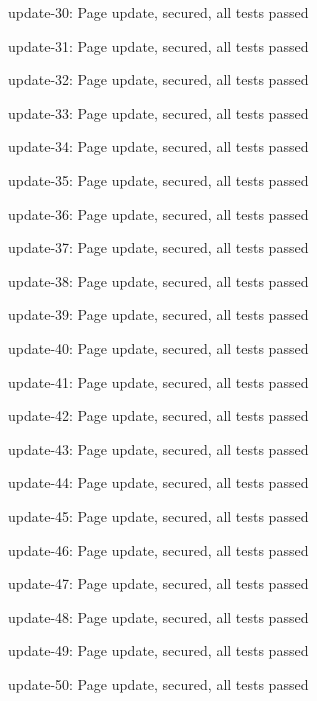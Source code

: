 update-30: Page update, secured, all tests passed

update-31: Page update, secured, all tests passed

update-32: Page update, secured, all tests passed

update-33: Page update, secured, all tests passed

update-34: Page update, secured, all tests passed

update-35: Page update, secured, all tests passed

update-36: Page update, secured, all tests passed

update-37: Page update, secured, all tests passed

update-38: Page update, secured, all tests passed

update-39: Page update, secured, all tests passed

update-40: Page update, secured, all tests passed

update-41: Page update, secured, all tests passed

update-42: Page update, secured, all tests passed

update-43: Page update, secured, all tests passed

update-44: Page update, secured, all tests passed

update-45: Page update, secured, all tests passed

update-46: Page update, secured, all tests passed

update-47: Page update, secured, all tests passed

update-48: Page update, secured, all tests passed

update-49: Page update, secured, all tests passed

update-50: Page update, secured, all tests passed